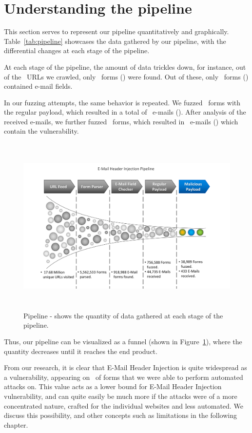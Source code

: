 \section[The Pipeline]{Understanding the pipeline}
This section serves to represent our pipeline quantitatively and graphically. Table~\ref{tab:pipeline} showcases the data gathered by our pipeline, with the differential changes at each stage of the pipeline. 

At each stage of the pipeline, the amount of data trickles down, for instance, out of the \urls\ URLs we crawled, only \forms\ forms (\formsDelta) were found. Out of these, only \emailforms\ forms (\emailformsDelta) contained e-mail fields.

In our fuzzing attempts, the same behavior is repeated. We fuzzed \fuzzed\ forms with the regular payload, which resulted in a total of \recd\ e-mails (\recdDelta). After analysis of the received e-mails, we further fuzzed \fuzzed\ forms, which resulted in \success\ e-mails (\successDelta) which contain the vulnerability.


\begin{figure}
	\centering
	\includegraphics[width=16cm, height=9cm]{Results/emailheaderpipeline}
	\caption[]{Pipeline - shows the quantity of data gathered at each stage of the pipeline.}
	\label{fig:pipeline}
\end{figure}

Thus, our pipeline can be visualized as a funnel (shown in Figure~\ref{fig:pipeline}), where the quantity decreases until it reaches the end product.

From our research, it is clear that E-Mail Header Injection is quite widespread as a vulnerability, appearing on \successDelta\ of forms that we were able to perform automated attacks on. This value acts as a lower bound for E-Mail Header Injection vulnerability, and can quite easily be much more if the attacks were of a more concentrated nature, crafted for the individual websites and less automated. We discuss this possibility, and other concepts such as limitations in the following chapter.